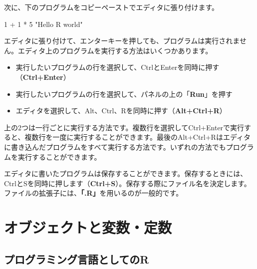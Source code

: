 \documentclass[
  letterpaper,
  DIV=11,
  numbers=noendperiod]{scrreprt}
\newenvironment{Shaded}{\begin{snugshade}}{\end{snugshade}}
\newcommand{\DecValTok}[1]{\textcolor[rgb]{0.68,0.00,0.00}{#1}}
\newcommand{\SpecialCharTok}[1]{\textcolor[rgb]{0.37,0.37,0.37}{#1}}
\newcommand{\StringTok}[1]{\textcolor[rgb]{0.13,0.47,0.30}{#1}}
\providecommand{\tightlist}{%
  \setlength{\itemsep}{0pt}\setlength{\parskip}{0pt}}\usepackage{longtable,booktabs,array}
\begin{document}
次に、下のプログラムをコピーペーストでエディタに張り付けます。

\begin{Shaded}
\begin{Highlighting}[]
\DecValTok{1} \SpecialCharTok{+} \DecValTok{1} \SpecialCharTok{*} \DecValTok{5}
\StringTok{"Hello R world"}
\end{Highlighting}
\end{Shaded}

エディタに張り付けて、エンターキーを押しても、プログラムは実行されません。エディタ上のプログラムを実行する方法はいくつかあります。

\begin{itemize}
\tightlist
\item
  実行したいプログラムの行を選択して、CtrlとEnterを同時に押す（\textbf{Ctrl+Enter}）
\item
  実行したいプログラムの行を選択して、パネルの上の「\textbf{Run}」を押す
\item
  エディタを選択して、Alt、Ctrl、Rを同時に押す（\textbf{Alt+Ctrl+R}）
\end{itemize}

上の2つは一行ごとに実行する方法です。複数行を選択してCtrl+Enterで実行すると、複数行を一度に実行することができます。最後のAlt+Ctrl+Rはエディタに書き込んだプログラムをすべて実行する方法です。いずれの方法でもプログラムを実行することができます。

エディタに書いたプログラムは保存することができます。保存するときには、CtrlとSを同時に押します（\textbf{Ctrl+S}）。保存する際にファイル名を決定します。ファイルの拡張子には、\textbf{「.R」}を用いるのが一般的です。


\hypertarget{ux30aaux30d6ux30b8ux30a7ux30afux30c8ux3068ux5909ux6570ux5b9aux6570}{%
\chapter{オブジェクトと変数・定数}\label{ux30aaux30d6ux30b8ux30a7ux30afux30c8ux3068ux5909ux6570ux5b9aux6570}}

\hypertarget{ux30d7ux30edux30b0ux30e9ux30dfux30f3ux30b0ux8a00ux8a9eux3068ux3057ux3066ux306er}{%
\section{プログラミング言語としてのR}\label{ux30d7ux30edux30b0ux30e9ux30dfux30f3ux30b0ux8a00ux8a9eux3068ux3057ux3066ux306er}}
\end{document}
